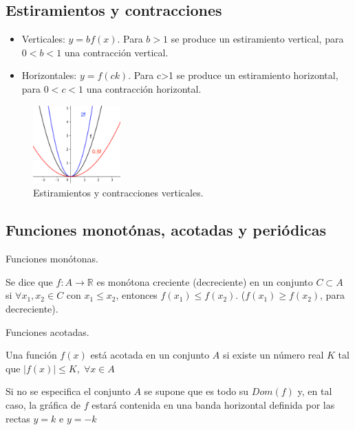 		\subsection{Estiramientos y contracciones}
		\begin{itemize}
			\item Verticales: $y=b f(x)$. Para $b>1$ se produce un estiramiento vertical, para $0<b<1$ una contracción vertical.
			\item Horizontales: $y=f(ck)$. Para c>1 se produce un estiramiento horizontal, para $0<c<1$ una contracción horizontal.
		\end{itemize}
		
		\begin{figure}[H]
			\centering
			\includegraphics[width=0.3\textwidth]{imagenes/imagenes02/T02IM11.png}
			\caption{Estiramientos y contracciones verticales.}
		\end{figure}
		
		\subsection{Funciones monotónas, acotadas y periódicas}
		
		\begin{defi}Funciones monótonas.
		
		 Se dice que $f:A \to \mathbb R$ es monótona creciente (decreciente) en un conjunto $C\subset A$ si $\forall x_1, x_2 \in C$ con $x_1\le x_2$, entonces $f(x_1)\le f(x_2)$. ($f(x_1)\ge f(x_2)$, para decreciente).
		\end{defi}
		
		\begin{defi} Funciones acotadas.
		
		Una función $f(x)$ está acotada en un conjunto $A$ si existe un número real $K$ tal que $|f(x)|\le K,\; \forall x \in A$	
		
		Si no se especifica el conjunto $A$ se supone que es todo su $Dom(f)$ y, en tal caso, la gráfica de $f$ estará contenida en una banda horizontal definida por las rectas $y=k$ e $y=-k$
		
		\end{defi}
		
